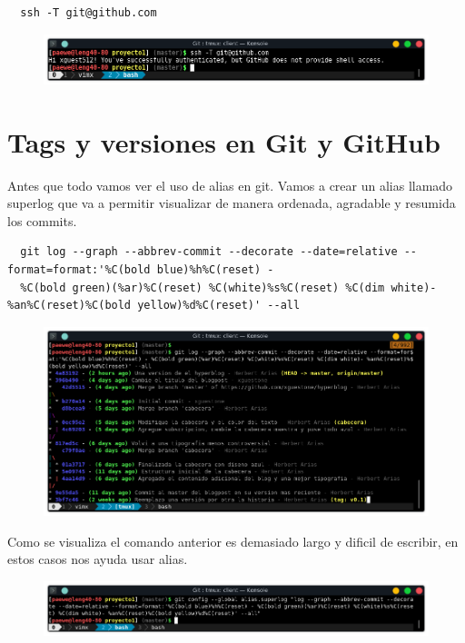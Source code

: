 \documentclass{article}
\begin{document}
\begin{verbatim}
  ssh -T git@github.com
\end{verbatim}

\begin{figure}[h!]
  \centering
  \includegraphics[scale=0.75]{./Pictures/235_ssh_test.png}
\end{figure}




\newpage

\section{Tags y versiones en Git y GitHub}%
Antes que todo vamos ver el uso de alias en git. Vamos a crear un alias llamado
superlog que va a permitir visualizar de manera ordenada, agradable y resumida
los commits.

\begin{verbatim}
  git log --graph --abbrev-commit --decorate --date=relative --format=format:'%C(bold blue)%h%C(reset) -
  %C(bold green)(%ar)%C(reset) %C(white)%s%C(reset) %C(dim white)- %an%C(reset)%C(bold yellow)%d%C(reset)' --all
\end{verbatim}

\begin{figure}[h!]
  \centering
  \includegraphics[scale=0.75]{./Pictures/238_git_log.png}
\end{figure}

Como se visualiza el comando anterior es demasiado largo y dificil de escribir,
en estos casos nos ayuda usar alias.

\begin{figure}[h!]
  \centering
  \includegraphics[scale=0.75]{./Pictures/239_gitalias.png}
\end{figure}
\end{document}
